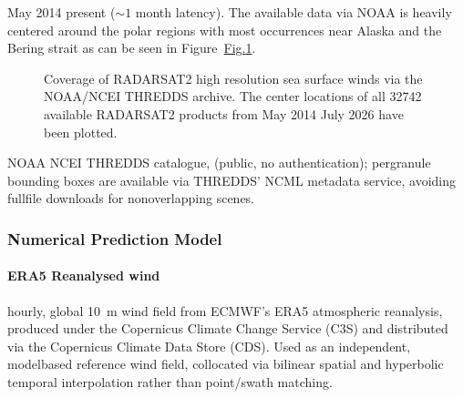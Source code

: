 \documentclass[a4paper,10pt,english]{sphinxmanual}
\begin{document}
\sphinxAtStartPar
May 2014 \sphinxhyphen{} present (\(\sim 1\) month latency). The available data via NOAA is heavily centered around the polar regions with most occurrences near Alaska and the Bering strait as can be seen in Figure \hyperref[\detokenize{05_reference_datasets:fig-radarsat2-coverage}]{Fig.\@ \ref{\detokenize{05_reference_datasets:fig-radarsat2-coverage}}}.

\begin{figure}[htbp]
\centering
\capstart

\noindent{}
\caption{Coverage of RADARSAT\sphinxhyphen{}2 high resolution sea surface winds via the NOAA/NCEI THREDDS archive. The center locations of all 32742 available RADARSAT\sphinxhyphen{}2 products from May 2014 \sphinxhyphen{} July 2026 have been plotted.}\label{\detokenize{05_reference_datasets:fig-radarsat2-coverage}}\end{figure}

\sphinxAtStartPar
{}

\sphinxAtStartPar
NOAA NCEI THREDDS catalogue,  (public, no authentication); per\sphinxhyphen{}granule bounding boxes are available via THREDDS’ NCML metadata service, avoiding full\sphinxhyphen{}file downloads for non\sphinxhyphen{}overlapping scenes.


\subsubsection{Numerical Prediction Model}
\label{\detokenize{05_reference_datasets:numerical-prediction-model}}

\paragraph{ERA5 Reanalysed wind}
\label{\detokenize{05_reference_datasets:era5-reanalysed-wind}}
\sphinxAtStartPar
{}

\sphinxAtStartPar
hourly, global 10 m wind field from ECMWF’s ERA5 atmospheric reanalysis, produced under the Copernicus Climate Change Service (C3S) and distributed via the Copernicus Climate Data Store (CDS). Used as an independent, model\sphinxhyphen{}based reference wind field, collocated via bilinear spatial and hyperbolic temporal interpolation rather than point/swath matching.
\end{document}
